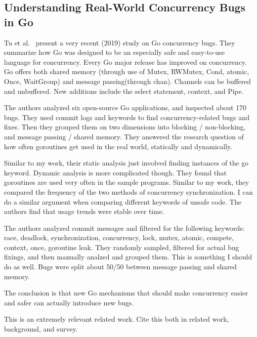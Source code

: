
\subsection{Understanding Real-World Concurrency Bugs in Go}
\label{subsec:understanding-real-world-concurrency-bugs-in-go}

Tu et al.~\cite{tu2019} present a very recent (2019) study on Go concurrency bugs.
They summarize how Go was designed to be an especially safe and easy-to-use language for concurrency.
Every Go major release has improved on concurrency.
Go offers both shared memory (through use of Mutex, RWMutex, Cond, atomic, Once, WaitGroup) and message passing(through
chan).
Channels can be buffered and unbuffered.
New additions include the select statement, context, and Pipe.

The authors analyzed six open-source Go applications, and inspected about 170 bugs.
They used commit logs and keywords to find concurrency-related bugs and fixes.
Then they grouped them on two dimensions into blocking / non-blocking, and message passing / shared memory.
They answered the research question of how often goroutines get used in the real world, statically and dynamically.

Similar to my work, their static analysis just involved finding instances of the go keyword.
Dynamic analysis is more complicated though.
They found that goroutines are used very often in the sample programs.
Similar to my work, they compared the frequency of the two methods of concurrency synchronization.
I can do a similar argument when comparing different keywords of unsafe code.
The authors find that usage trends were stable over time.

The authors analyzed commit messages and filtered for the following keywords: race, deadlock, synchronization,
concurrency, lock, mutex, atomic, compete, context, once, goroutine leak.
They randomly sampled, filtered for actual bug fixings, and then manually analzed and grouped them.
This is something I should do as well.
Bugs were split about 50/50 between message passing and shared memory.

The conclusion is that new Go mechanisms that should make concurrency easier and safer can actually introduce new bugs.

This is an extremely relevant related work.
Cite this both in related work, background, and survey.


